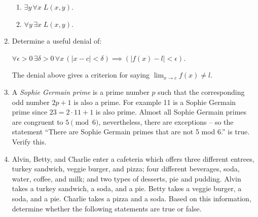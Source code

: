 \begin{enumerate}
{\begin{enumerate}
Here's a couple of bonus questions. Two of the statements above have different meanings if you just interchange the order that the quantifiers appear in. What do the following mean (in contrast to the ones above)?

\item $\exists y \, \forall x \; L(x, y)$.
\item $\forall y \, \exists x \; L(x,y)$.
\end{enumerate}

}

\item Determine a useful denial of: 

$\displaystyle \forall \epsilon>0 \, \exists 
\delta>0 \, \forall x \, (|x-c| < \delta) \implies (|f(x)-l| < \epsilon) $.

The denial above gives a criterion for saying $\lim_{x\rightarrow c}f(x) \neq l.$


\item A  \emph{Sophie Germain prime} is a prime number $p$
such that the corresponding odd number $2p+1$ is also a prime.  For example 11 is a 
Sophie Germain prime since $23 = 2\cdot 11 + 1$ is also prime.  Almost all Sophie Germain
primes are congruent to $5 \pmod{6}$, nevertheless, there are exceptions -- so the
statement ``There are Sophie Germain primes that are not 5 mod 6.'' is true.  Verify this.


\item  Alvin, Betty, and Charlie enter a cafeteria which offers three different
entrees, turkey sandwich, veggie burger, and pizza; four different
beverages, soda, water, coffee, and milk; and two types of desserts,
pie and pudding. Alvin takes a turkey sandwich, a soda, and a pie.
Betty takes a veggie burger, a soda, and a pie. Charlie takes a pizza
and a soda. Based on this information, determine whether the following
statements are true or false.


\end{enumerate}
